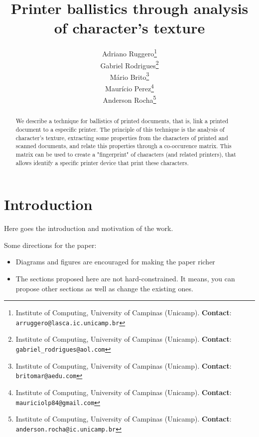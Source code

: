 \documentclass[10pt,twocolumn,letterpaper]{article}
\begin{document}
\title{Printer ballistics through analysis of character's texture}
\author{Adriano Ruggero\thanks{Institute of Computing, University of Campinas (Unicamp). \textbf{Contact}: \tt\small{arruggero@lasca.ic.unicamp.br}}\\
Gabriel Rodrigues\thanks{Institute of Computing, University of Campinas (Unicamp). \textbf{Contact}: \tt\small{gabriel\_rodrigues@aol.com}}\\
Mário Brito\thanks{Institute of Computing, University of Campinas (Unicamp). \textbf{Contact}:
\tt\small{britomar@aedu.com}}\\
Maurício Perez\thanks{Institute of Computing, University of Campinas (Unicamp). \textbf{Contact}:
\tt\small{mauriciolp84@gmail.com}}\\
Anderson Rocha\thanks{Institute of Computing, University of Campinas (Unicamp). \textbf{Contact}: \tt\small{anderson.rocha@ic.unicamp.br}}
}

\maketitle
\begin{abstract}
We describe a technique for ballistics of printed documents, that is, link a printed document to a especific printer. The principle of this technique is the analysis of character's texture, extracting some properties from the characters of printed and scanned documents, and relate this properties through a co-occurence matrix. This matrix can be used to create a "fingerprint" of characters (and related printers), that allows identify a specific printer device that print these characters.
\end{abstract}

\section{Introduction}
Here goes the introduction and motivation of the work.

Some directions for the paper:

\begin{itemize}
	\item Diagrams and figures are encouraged for making the paper richer
	\item The sections proposed here are not hard-constrained. It means, you 
	can propose other sections as well as change the existing ones. 
\end{itemize}
\end{document}

